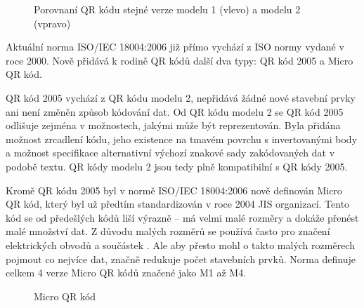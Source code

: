 \begin{figure}[H]
  \begin{center}
    \caption{Porovnaní QR kódu stejné verze modelu 1 (vlevo) a modelu 2 (vpravo)}
    \label{QRCodeModel12Comparision}
  \end{center}
\end{figure}

Aktuální norma ISO/IEC 18004:2006 již přímo vychází z ISO normy vydané v roce 
2000. Nově přidává k rodině QR kódů další dva typy: QR kód 2005 a Micro QR kód. 

QR kód 2005 vychází z QR kódu modelu 2, nepřidává žádné nové stavební prvky 
ani není změněn způsob kódování dat. Od QR kódu modelu 2 se QR kód 2005 
odlišuje zejména v možnostech, jakými může být reprezentován. Byla přidána
 možnost zrcadlení kódu, jeho existence na tmavém povrchu s invertovanými body 
 a možnost specifikace alternativní výchozí znakové sady zakódovaných dat v 
 podobě textu. QR kódy modelu 2 jsou tedy plně kompatibilní s QR kódy 2005. 

Kromě QR kódu 2005 byl v normě ISO/IEC 18004:2006 nově definován Micro QR kód, 
který byl už předtím standardizován v roce 2004 JIS organizací. Tento kód 
se od předešlých kódů liší výrazně -- má velmi malé rozměry a dokáže přenést 
malé množství dat. Z důvodu malých rozměrů se používá často pro značení 
elektrických obvodů a součástek \cite{microQRCodeDenso}. Ale aby přesto mohl o
takto malých rozměrech pojmout co nejvíce dat, značně redukuje počet stavebních
prvků. Norma definuje celkem 4 verze Micro QR kódů značené jako M1 až M4.

\begin{figure}[H]
  \begin{center}
    \caption{Micro QR kód}
    \label{microQRIntroducion}
  \end{center}
\end{figure}

